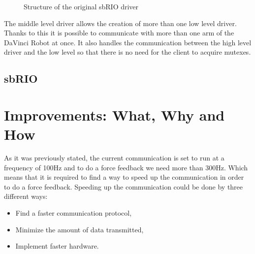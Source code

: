 \begin{figure}[H]
\centering
{}
\caption{Structure of the original sbRIO driver}
\label{original_driver}
\end{figure}

The middle level driver allows the creation of more than one low level driver. Thanks to this it is possible to communicate with more than one arm of the DaVinci Robot at once. It also handles the communication between the high level driver and the low level so that there is no need for the client to acquire mutexes.


\subsection{sbRIO}

\section{Improvements: What, Why and How}

As it was previously stated, the current communication is set to run at a frequency of 100Hz and to do a force feedback we need more than 300Hz. Which means that it is required to find a way to speed up the communication in order to do a force feedback. Speeding up the communication could be done by three different ways:

\begin{itemize}
	\item Find a faster communication protocol,
	\item Minimize the amount of data transmitted,
	\item Implement faster hardware.	
\end{itemize}

